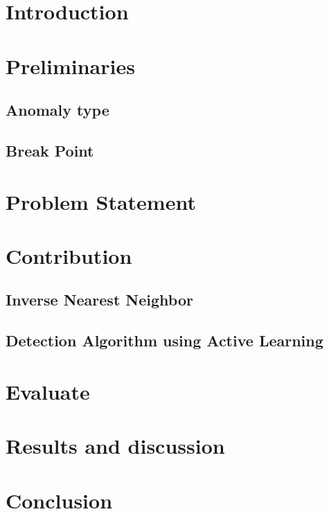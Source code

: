 \section{Introduction}
\section{Preliminaries}
\subsection{Anomaly type}
\subsection{Break Point}
\section{Problem Statement}
\section{Contribution}
\subsection{Inverse Nearest Neighbor}
\subsection{Detection Algorithm using Active Learning}
\section{Evaluate}
\section{Results and discussion}
\section{Conclusion}
